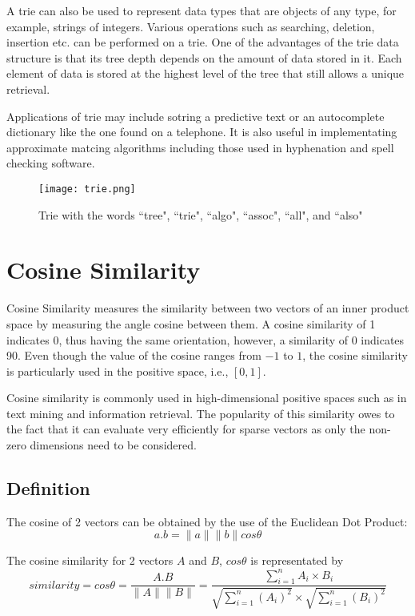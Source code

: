 		A trie can also be used to represent data types that are objects of any type, for example, strings of integers. Various operations such as searching, deletion, insertion etc. can be performed on a trie. One of the advantages of the trie data structure is that its tree depth depends on the amount of data stored in it. Each element of data is stored at the highest level of the tree that still allows a unique retrieval.
		
		Applications of trie may include sotring a predictive text or an autocomplete dictionary like the one found on a telephone. It is also useful in implementating approximate matcing algorithms including those used in hyphenation and spell checking software.
		
		\begin{figure}[h!]
			\centering
			\texttt{[image: trie.png]}
			\caption{Trie with the words ``tree", ``trie", ``algo", ``assoc", ``all", and ``also" \label{trie}}
		\end{figure}
	
	\section{Cosine Similarity}	
	\label{sec:cosine_similarity}
		Cosine Similarity \cite{singhal2001modern} measures the similarity between two vectors of an inner product space by measuring the angle cosine between them. A cosine similarity of 1 indicates 0\textdegree, thus having the same orientation, however, a similarity of 0 indicates 90\textdegree. Even though the value of the cosine ranges from \(-1\) to \(1\), the cosine similarity is particularly used in the positive space, i.e., \([0,1]\).
		
		Cosine similarity is commonly used in high-dimensional positive spaces such as in text mining and information retrieval. The popularity of this similarity owes to the fact that it can evaluate very efficiently for sparse vectors as only the non-zero dimensions need to be considered.
		
		\subsection{Definition}
			The cosine of 2 vectors can be obtained by the use of the Euclidean Dot Product:
			\[ a . b = \|a\| \|b\| cos \theta \]
			
			The cosine similarity for 2 vectors \(A\) and \(B\), \(cos \theta \) is representated by
			\[ similarity = cos \theta = \frac{A.B}{\|A\|\|B\|} = \frac{\displaystyle\sum_{i=1}^{n} A_i \times B_i}{\sqrt{\displaystyle\sum_{i=1}^{n} (A_i) ^ 2} \times \sqrt{\displaystyle\sum_{i=1}^{n} (B_i) ^ 2}} \]